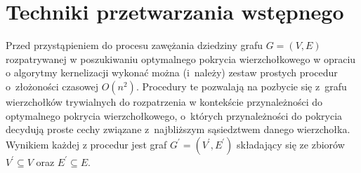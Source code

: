 \section{Techniki przetwarzania wstępnego}\label{Section_preprocessing}

Przed przystąpieniem do procesu zawężania dziedziny grafu $G=(V,E)$
rozpatrywanej w poszukiwaniu optymalnego pokrycia wierzchołkowego w opraciu o algorytmy kernelizacji wykonać można 
(i~należy) zestaw prostych procedur o~złożoności czasowej $O(n^2)$.
Procedury te pozwalają na pozbycie się z~grafu wierzchołków trywialnych do 
rozpatrzenia w kontekście przynależności do optymalnego pokrycia wierzchołkowego,
o~których przynależności do pokrycia decydują proste cechy związane
z~najbliższym sąsiedztwem danego wierzchołka.
Wynikiem każdej z procedur jest graf $G^\prime=(V^\prime, E^\prime)$ składający się ze zbiorów $V^\prime\subseteq V$ oraz $E^\prime \subseteq E$.

